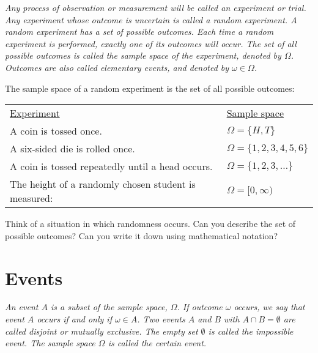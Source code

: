 \begin{definition}
\ben
\it
Any process of observation or measurement will be called an \emph{experiment} or \emph{trial}.
\it
Any experiment whose outcome is uncertain is called a \emph{random experiment}.
\it
A random experiment has a set of possible \emph{outcomes}.
\it
Each time a random experiment is performed, \emph{exactly one} of its outcomes will occur.
\it
The set of all possible outcomes is called the \emph{sample space} of the experiment, denoted by $\Omega$.
\it
Outcomes are also called \emph{elementary events}, and denoted by $\omega\in\Omega$.
\een
\end{definition}

\begin{example}
The sample space of a random experiment is the set of all possible outcomes:
\begin{center}
\begin{tabular}{ll}
\underline{Experiment}									& \underline{Sample space} \\[1ex]
A coin is tossed once.									& $\Omega = \{H,T\}$ \\
A six-sided die is rolled once.							& $\Omega=\{1,2,3,4,5,6\}$ \\
A coin is tossed repeatedly until a head occurs.		& $\Omega = \{1,2,3,\ldots\}$ \\
The height of a randomly chosen student is measured: 	& $\Omega = [0,\infty)$
\end{tabular}
\end{center}
\end{example}

\begin{exercise}
Think of a situation in which randomness occurs. Can you describe the set of possible outcomes? Can you write it down using mathematical notation?
\end{exercise}

\section{Events}

\begin{definition}
\bit
\it An \emph{event} $A$ is a subset of the sample space, $\Omega$. 
\it If outcome $\omega$ occurs, we say that event $A$ \emph{occurs} if and only if $\omega\in A$.
\it Two events $A$ and $B$ with $A\cap B=\emptyset$ are called \emph{disjoint} or \emph{mutually exclusive}.
\it The empty set $\emptyset$ is called the \emph{impossible event}.
\it The sample space $\Omega$ is called the \emph{certain event}.
\eit
\end{definition}


